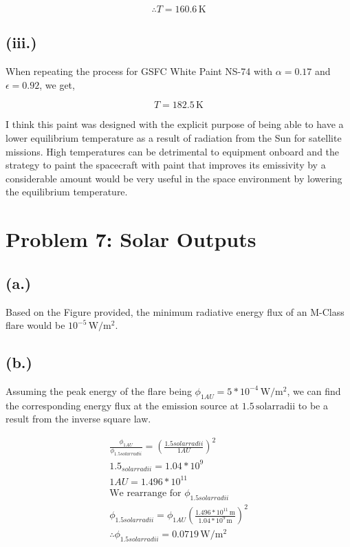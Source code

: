 \documentclass[11pt]{article}
\begin{document}
\[
\boxed{\therefore T = 160.6 \, \mathrm{K}}
\]

\subsection*{(iii.)}
When repeating the process for GSFC White Paint NS-74 with $\alpha = 0.17$
and $\epsilon = 0.92$, we get,

\[
\boxed{T = 182.5 \, \mathrm{K}}
\]

\hspace*{2em}I think this paint was designed with the explicit purpose of being able to 
have a lower equilibrium temperature as a result of radiation from the Sun 
for satellite missions. High temperatures can be detrimental to equipment
onboard and the strategy to paint the spacecraft with paint that improves
its emissivity by a considerable amount would be very useful in the space 
environment by lowering the equilibrium temperature. 

\section*{Problem 7: Solar Outputs}


\subsection*{{(a.)}}
Based on the Figure provided, the minimum
radiative energy flux of an M-Class flare
would be $10^{-5} \, \mathrm{W/m^2}$.

\subsection*{{(b.)}}
Assuming the peak energy of the flare being $\phi_{1AU}=5*10^{-4} \, \mathrm{W/m^2}$, 
we can find the corresponding energy flux at the emission source at $1.5 \, \mathrm{solar radii}$
to be a result from the inverse square law.

\[
\begin{gathered}
\frac{\phi_{1AU}}{\phi_{1.5 solar radii}} = (\frac{1. 5solar radii}{1AU})^2 \\
1.5_{solarradii} = 1.04*10^9 \\
1AU = 1.496*10^11 \\
\text{We rearrange for } \phi_{1.5 solar radii} \\
\phi_{1.5 solar radii} = \phi_{1AU}(\frac{1.496*10^11 \, \mathrm{m}}{1.04*10^9 \, \mathrm{m}})^2 \\
\boxed{\therefore \phi_{1.5 solar radii} = 0.0719 \, \mathrm{W/m^2}}
\end{gathered}
\]
\end{document}
